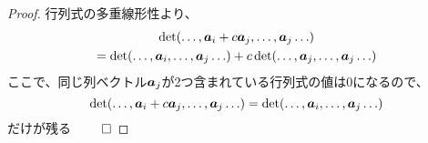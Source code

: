 \documentclass[../../../topic_linear-algebra]{subfiles}
\begin{document}
\begin{proof}
  行列式の多重線形性より、
  \begin{multline*}
    \det(\ldots, \vb*{a}_i + c \vb*{a}_j,\ldots, \vb*{a}_j \ldots) \\
    = \det(\ldots, \vb*{a}_i,\ldots, \vb*{a}_j \ldots) + c\det(\ldots, \vb*{a}_j,\ldots, \vb*{a}_j \ldots)
  \end{multline*}
  ここで、同じ列ベクトル$\vb*{a}_j$が2つ含まれている行列式の値は0になるので、
  \begin{equation*}
    \det(\ldots, \vb*{a}_i + c \vb*{a}_j,\ldots, \vb*{a}_j \ldots) = \det(\ldots, \vb*{a}_i,\ldots, \vb*{a}_j \ldots)
  \end{equation*}
  だけが残る $\qed$
\end{proof}
\end{document}
